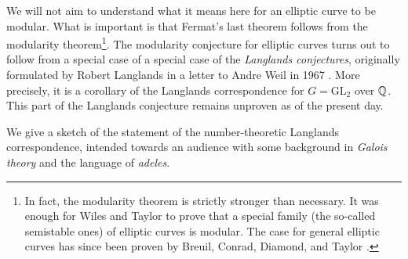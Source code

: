 We will not aim to understand what it means here for an elliptic curve to be modular.
What is important is that Fermat's last theorem follows from the modularity theorem\footnote{In fact, the modularity theorem is strictly stronger than necessary. It was enough for Wiles and Taylor to prove that a special family (the so-called semistable ones) of elliptic curves is modular. The case for general elliptic curves has since been proven by Breuil, Conrad, Diamond, and Taylor \cite{breuil2001}.}. The modularity conjecture for elliptic curves turns out to follow from a special case of a special case of the \emph{Langlands conjectures}, originally formulated by Robert Langlands in a letter to Andre Weil in 1967 \cite{langlands1967}.
More precisely, it is a corollary of the Langlands correspondence for $G = \mathrm{GL}_2$ over $\mathbb{Q}$. This part of the Langlands conjecture remains unproven as of the present day.

We give a sketch of the statement of the number-theoretic Langlands correspondence, intended towards an audience with some background in \emph{Galois theory} and the language of \emph{adeles}. 

